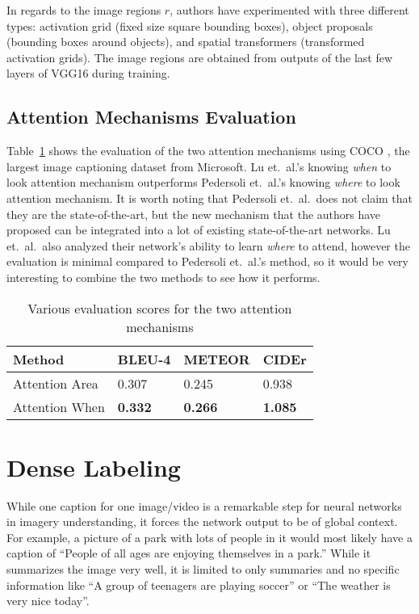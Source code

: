 \documentclass[12pt,onecolumn,letterpaper,draftclsnofoot]{article}
\newcommand{\tabref}[1]{Table~\ref{tab:#1}}
\begin{document}
In regards to the image regions $r$, authors have experimented with three
different types: activation grid (fixed size square bounding boxes), object
proposals (bounding boxes around objects), and spatial transformers
(transformed activation grids). The image regions are obtained from outputs of
the last few layers of VGG16 during training.

\subsection{Attention Mechanisms Evaluation}
\tabref{attention} shows the evaluation of the two attention mechanisms using
COCO \cite{coco}, the largest image captioning dataset from Microsoft. Lu et.\
al.'s knowing \textit{when} to look attention mechanism outperforms Pedersoli
et.\ al.'s knowing \textit{where} to look attention mechanism. It is worth
noting that Pedersoli et.\ al.\ does not claim that they are the
state-of-the-art, but the new mechanism that the authors have proposed can be
integrated into a lot of existing state-of-the-art networks. Lu et.\ al.\ also
analyzed their network's ability to learn \textit{where} to attend, however the
evaluation is minimal compared to Pedersoli et.\ al.'s method, so it would be
very interesting to combine the two methods to see how it performs.
%
\begin{table}[]
\centering
\caption{Various evaluation scores for the two attention mechanisms}
\label{tab:attention}
\begin{tabular}{llll}
	\toprule
	Method         & BLEU-4         & METEOR         & CIDEr          \\
	\hline
	Attention Area & 0.307          & 0.245          & 0.938          \\
	Attention When & \textbf{0.332} & \textbf{0.266} & \textbf{1.085} \\
	\bottomrule
\end{tabular}
\end{table}
%
\section{Dense Labeling}

While one caption for one image/video is a remarkable step for neural networks
in imagery understanding, it forces the network output to be of global
context. For example, a picture of a park with lots of people in it would most
likely have a caption of ``People of all ages are enjoying themselves in a
park.'' While it summarizes the image very well, it is limited to only
summaries and no specific information like ``A group of teenagers are playing
soccer'' or ``The weather is very nice today''.
\end{document}
